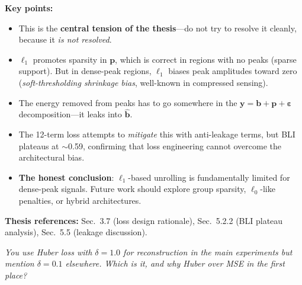 \documentclass[11pt, letterpaper]{article}
\newcounter{qcounter}
\newcommand{\question}[1]{%
  \stepcounter{qcounter}%
  \begin{questionbox}[Q\theqcounter]%
    \itshape #1%
  \end{questionbox}%
}
\begin{document}
\begin{answerbox}
\textbf{Key points:}
\begin{itemize}[nosep]
  \item This is the \textbf{central tension of the thesis}---do not
        try to resolve it cleanly, because it \emph{is not resolved}.
  \item $\ell_1$ promotes sparsity in $\mathbf{p}$, which is correct
        in regions with no peaks (sparse support).  But in dense-peak
        regions, $\ell_1$ biases peak amplitudes toward zero
        (\emph{soft-thresholding shrinkage bias}, well-known in
        compressed sensing).
  \item The energy removed from peaks has to go somewhere in the
        $\mathbf{y} = \mathbf{b} + \mathbf{p} + \boldsymbol{\varepsilon}$
        decomposition---it leaks into $\hat{\mathbf{b}}$.
  \item The 12-term loss attempts to \emph{mitigate} this with
        anti-leakage terms, but BLI plateaus at $\sim$0.59, confirming
        that loss engineering cannot overcome the architectural bias.
  \item \textbf{The honest conclusion}: $\ell_1$-based unrolling is
        fundamentally limited for dense-peak signals.  Future work
        should explore group sparsity, $\ell_0$-like penalties, or
        hybrid architectures.
\end{itemize}
\textbf{Thesis references:} Sec.~3.7 (loss design rationale), Sec.~5.2.2 (BLI plateau analysis), Sec.~5.5 (leakage discussion).
\end{answerbox}

\question{You use Huber loss with $\delta{=}1.0$ for reconstruction in the
main experiments but mention $\delta{=}0.1$ elsewhere.  Which is it,
and why Huber over MSE in the first place?}
\end{document}
